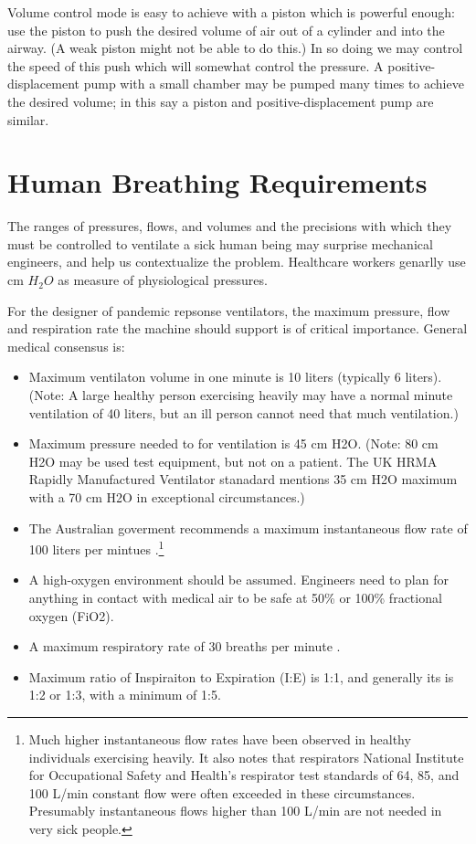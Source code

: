 \documentclass[conference]{article}
\begin{document}
Volume control mode is easy to achieve with a piston which is
powerful enough: use the piston to push the desired volume of
air out of a cylinder and into the airway. (A weak piston might
not be able to do this.) In so doing we may control the speed
of this push which will somewhat control the pressure.
A positive-displacement pump with a small chamber may be pumped
many times to achieve the desired volume; in this say a
piston and positive-displacement pump are similar.

\section{Human Breathing Requirements}

The ranges of pressures, flows, and volumes and the precisions with which
they must be controlled to ventilate a sick human being may surprise
mechanical engineers, and help us contextualize the problem.
Healthcare workers genarlly use cm $H_2O$ as measure of physiological
pressures.

For the designer of pandemic repsonse ventilators, the maximum pressure,
flow and respiration rate the machine should support is of critical importance.
General medical consensus is:
\begin{itemize}
\item Maximum ventilaton volume in one minute is 10 liters (typically 6 liters).
  (Note: A large healthy person exercising heavily may have a normal minute ventilation of 40 liters, but an ill person cannot need that much ventilation.)
\item Maximum pressure needed to for ventilation is 45 cm H2O\cite{de2012large,bein2016standard,australiarequirement}.
  (Note: 80 cm H2O may be used test equipment, but not on a patient.
  The UK HRMA Rapidly Manufactured Ventilator stanadard mentions 35 cm H2O maximum with a 70 cm H2O in exceptional circumstances\cite{rmvs}.)
\item The Australian goverment recommends a maximum instantaneous flow rate of 100 liters per mintues \cite{australiarequirement}.\footnote{Much higher instantaneous flow rates have been observed in healthy individuals exercising heavily\cite{coyne2006inspiratory}. It also notes that
respirators National Institute for Occupational Safety and Health's respirator test standards of 64, 85, and 100 L/min constant flow
were often exceeded in these circumstances. Presumably instantaneous flows higher
than 100 L/min are not needed in very sick people.}
\item A high-oxygen environment should be assumed. Engineers need to plan for anything
  in contact with medical air to be safe at 50\% or 100\% fractional oxygen (FiO2).
\item A maximum respiratory rate of 30 breaths per minute \cite{rmvs}.
  \item Maximum ratio of Inspiraiton to Expiration (I:E) is 1:1, and generally its is 1:2 or 1:3, with a minimum of 1:5.
  \end{itemize}
\end{document}
